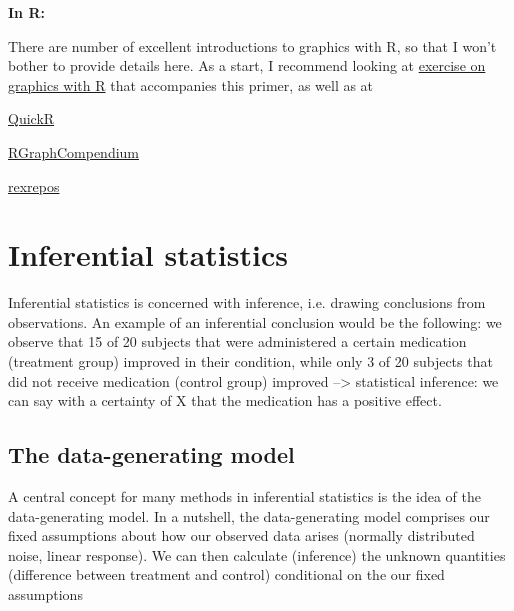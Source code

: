 \documentclass[a4paper,twoside]{tufte-book}\usepackage[]{graphicx}\usepackage[]{color}
\begin{document}
\vspace{1cm}
\begin{fullwidth}
\begin{mdframed}
    
\textbf{In R:} 

There are number of excellent introductions to graphics with R, so that I won't bother to provide details here. As a start, I recommend looking at \href{https://github.com/florianhartig/ResearchSkills/tree/master/Labs/Statistics/Practicals/GraphicsInR}{exercise on graphics with R} that accompanies this primer, as well as at 

\begin{itemize*}
  \item \href{http://www.statmethods.net/graphs/index.html}{QuickR}
  \item \href{http://shinyapps.org/apps/RGraphCompendium/index.php}{RGraphCompendium}
  \item \href{http://www.uni-kiel.de/psychologie/rexrepos/rerDiagrams.html}{rexrepos}
\end{itemize*}

\end{mdframed}
\end{fullwidth} 


\chapter{Inferential statistics}


Inferential statistics is concerned with inference, i.e. drawing conclusions from observations. An example of an inferential conclusion would be the following: we observe that 15 of 20 subjects that were administered a certain medication (treatment group) improved in their condition, while only 3 of 20 subjects that did not receive medication (control group) improved --> statistical inference: we can say with a certainty of X that the medication has a positive effect.  


\section{The data-generating model}


A central concept for many methods in inferential statistics is the idea of the data-generating model. In a nutshell, the data-generating model comprises our fixed assumptions about how our observed data arises (normally distributed noise, linear response). We can then calculate (inference) the unknown quantities (difference between treatment and control) conditional on the our fixed assumptions 
\end{document}
